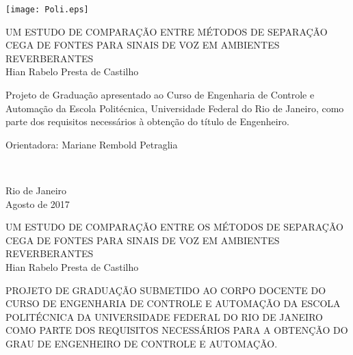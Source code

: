\texttt{[image: Poli.eps]}

\begin{center} 									%
\large{UM ESTUDO DE COMPARAÇÃO ENTRE MÉTODOS DE SEPARAÇÃO CEGA DE FONTES PARA SINAIS DE VOZ EM AMBIENTES REVERBERANTES}\\                                   %
    \vspace{2cm}
\large{Hian Rabelo Presta de Castilho}\\		%
\end{center}									%

\vspace{2cm}									%
\hspace{7cm}									%

\hfill 
	\parbox{8.0cm}
	{Projeto de Graduação apresentado ao Curso de 
	 Engenharia de Controle e Automação da Escola 
	 Politécnica, Universidade Federal do Rio de 
	 Janeiro, como parte dos requisitos necessários 
	 à obtenção do título de Engenheiro.\\}
\vspace{2cm}


\hfill 
	\parbox{8.0cm}
	{Orientadora: Mariane Rembold Petraglia} \\

\vspace{2cm}

\begin{center}
Rio de Janeiro \\
Agosto de 2017
\end{center}

\pagebreak


\begin{center}
\large{UM ESTUDO DE COMPARAÇÃO ENTRE OS MÉTODOS DE SEPARAÇÃO CEGA DE FONTES PARA SINAIS DE VOZ EM AMBIENTES REVERBERANTES}\\
   \vspace{1cm}
\large{Hian Rabelo Presta de Castilho}\\
\end{center}
   \vspace{2cm}
PROJETO DE GRADUAÇÃO SUBMETIDO AO CORPO DOCENTE DO CURSO DE ENGENHARIA DE CONTROLE E AUTOMAÇÃO DA ESCOLA POLITÉCNICA DA UNIVERSIDADE FEDERAL DO RIO DE JANEIRO COMO PARTE DOS REQUISITOS NECESSÁRIOS PARA A OBTENÇÃO DO GRAU DE ENGENHEIRO DE CONTROLE E AUTOMAÇÃO.   
   
